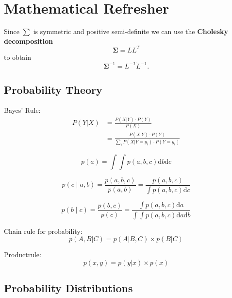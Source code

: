 \documentclass[a4paper,10pt,twoside=true,DIV=10,headsepline,plainheadsepline]{scrartcl}
\begin{document}
	\section{Mathematical Refresher}

		Since $ \sum $ is symmetric and positive semi-definite we can use the \textbf{Cholesky 			decomposition}
			\begin{equation} 
				\mathbf{\Sigma} = LL^T 
			\end{equation}
		to obtain 
			\begin{equation} 
				\mathbf{\Sigma}^{-1} = L^{-T}L^{-1}.
			\end{equation}

		 \subsection{Probability Theory}
		
		Bayes' Rule:
			\begin{align}
				P(Y|X) &= \frac{P(X|Y) \cdot P(Y)}{P(X)} \\
				&= \frac{P(X|Y) \cdot P(Y)}{\sum_{i} P(X|Y=y_i) \cdot P(Y = y_i)}
			\end{align}

		
		\begin{equation}
			p(a) = \int\int p(a,b,c) \mathrm{d}b \mathrm{d}c
		\end{equation}
	
		\begin{equation}
			p(c\mid a,b) = \frac{p(a,b,c)}{p(a,b)} = \frac{p(a,b,c)}{\int p(a,b,c) \mathrm{d}c}
		\end{equation}

		\begin{equation}
			p(b\mid c) = \frac{p(b,c)}{p(c)} = \frac{\int p(a,b,c)\mathrm{d}a}{\int\int p(a,b,c) \mathrm{d}a \mathrm{d}b}
		\end{equation}

		Chain rule for probability:
			\begin{equation}
				p(A,B | C) = p(A | B,C) \times p(B | C)
			\end{equation}

		Productrule:
			\begin{equation}
				p(x,y) = p(y | x) \times p(x)
			\end{equation}


		\subsection{Probability Distributions}
\end{document}
